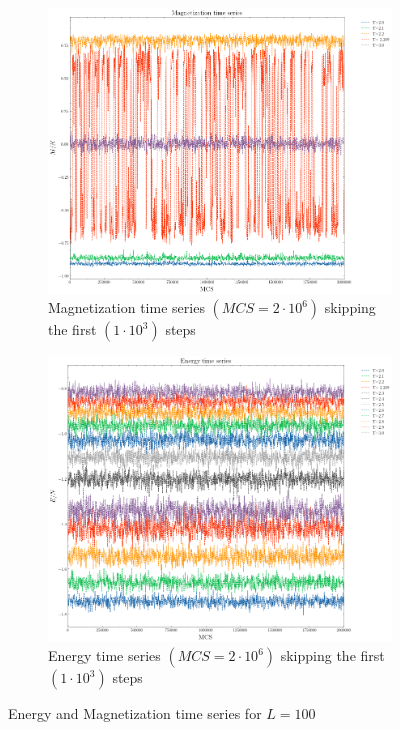 \documentclass[article]{revtex4}
\begin{document}
\begin{figure}[h!]
\begin{subfigure}{.5\textwidth}
  \centering
  \includegraphics[width=1\linewidth]{M_vs_steps10e5.png}
  \caption{Magnetization time series $ (MCS = 2 \cdot10^{6})$ skipping the first $(1 \cdot10^{3})$ steps}
\end{subfigure}%
\begin{subfigure}{.5\textwidth}
  \centering
  \includegraphics[width=1\linewidth]{E_vs_steps10e5.png}
  \caption{Energy time series $ (MCS = 2 \cdot10^{6})$ skipping the first $(1 \cdot10^{3})$ steps}
\end{subfigure}
\caption{Energy and Magnetization time series for $L = 100$}
\end{figure}
\end{document}
